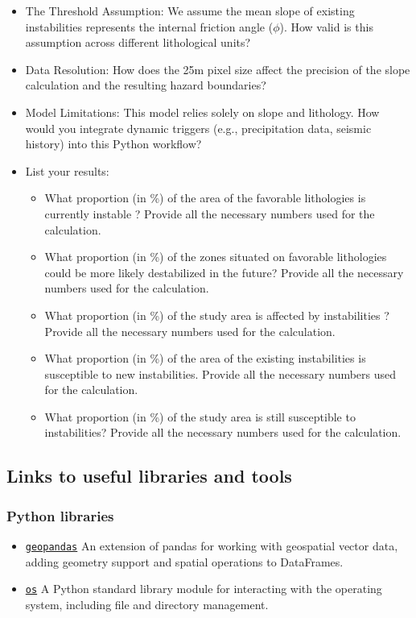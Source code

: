 \documentclass[
  letterpaper,
  DIV=11,
  numbers=noendperiod]{scrartcl}
\providecommand{\tightlist}{%
  \setlength{\itemsep}{0pt}\setlength{\parskip}{0pt}}
\begin{document}
\begin{itemize}
\tightlist
\item
  The Threshold Assumption: We assume the mean slope of existing
  instabilities represents the internal friction angle (\(\phi\)). How
  valid is this assumption across different lithological units?
\item
  Data Resolution: How does the 25m pixel size affect the precision of
  the slope calculation and the resulting hazard boundaries?
\item
  Model Limitations: This model relies solely on slope and lithology.
  How would you integrate dynamic triggers (e.g., precipitation data,
  seismic history) into this Python workflow?
\item
  List your results:

  \begin{itemize}
  \tightlist
  \item
    What proportion (in \%) of the area of the favorable lithologies is
    currently instable ? Provide all the necessary numbers used for the
    calculation.
  \item
    What proportion (in \%) of the zones situated on favorable
    lithologies could be more likely destabilized in the future? Provide
    all the necessary numbers used for the calculation.
  \item
    What proportion (in \%) of the study area is affected by
    instabilities ? Provide all the necessary numbers used for the
    calculation.
  \item
    What proportion (in \%) of the area of the existing instabilities is
    susceptible to new instabilities. Provide all the necessary numbers
    used for the calculation.
  \item
    What proportion (in \%) of the study area is still susceptible to
    instabilities? Provide all the necessary numbers used for the
    calculation.
  \end{itemize}
\end{itemize}

\subsection{Links to useful libraries and
tools}\label{links-to-useful-libraries-and-tools}

\subsubsection{Python libraries}\label{python-libraries-1}

\begin{itemize}
\item
  \href{https://geopandas.org/}{\texttt{geopandas}} An extension of
  pandas for working with geospatial vector data, adding geometry
  support and spatial operations to DataFrames.
\item
  \href{https://docs.python.org/3/library/os.html}{\texttt{os}} A Python
  standard library module for interacting with the operating system,
  including file and directory management.
\end{itemize}
\end{document}
